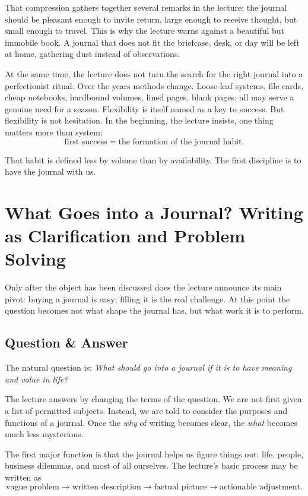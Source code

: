 That compression gathers together several remarks in the lecture: the journal should be pleasant enough to invite return, large enough to receive thought, but small enough to travel. This is why the lecture warns against a beautiful but immobile book. A journal that does not fit the briefcase, desk, or day will be left at home, gathering dust instead of observations.

At the same time, the lecture does not turn the search for the right journal into a perfectionist ritual. Over the years methods change. Loose-leaf systems, file cards, cheap notebooks, hardbound volumes, lined pages, blank pages: all may serve a genuine need for a season. Flexibility is itself named as a key to success. But flexibility is not hesitation. In the beginning, the lecture insists, one thing matters more than system:
\[
\text{first success}=\text{the formation of the journal habit}.
\]

That habit is defined less by volume than by availability. The first discipline is to have the journal with us.

\section{What Goes into a Journal? Writing as Clarification and Problem Solving}

Only after the object has been discussed does the lecture announce its main pivot: buying a journal is easy; filling it is the real challenge. At this point the question becomes not what shape the journal has, but what work it is to perform.

\subsection{Question \& Answer}

The natural question is: \emph{What should go into a journal if it is to have meaning and value in life?}

The lecture answers by changing the terms of the question. We are not first given a list of permitted subjects. Instead, we are told to consider the purposes and functions of a journal. Once the \emph{why} of writing becomes clear, the \emph{what} becomes much less mysterious.

The first major function is that the journal helps us figure things out: life, people, business dilemmas, and most of all ourselves. The lecture's basic process may be written as
\begin{equation}
\text{vague problem}\rightarrow \text{written description}\rightarrow \text{factual picture}\rightarrow \text{actionable adjustment}.
\end{equation}

